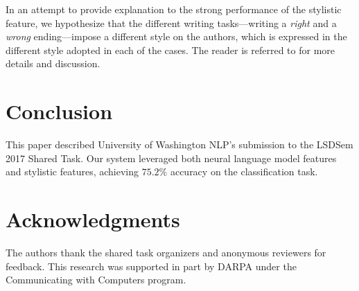 \documentclass[a4paper,11pt]{article}
\begin{document}
In an attempt to provide explanation to the strong performance of the stylistic feature, 
we hypothesize that the different writing tasks---writing a {\it right} and a {\it wrong} ending---impose a different style on the authors, which is expressed in the different style adopted in each of the cases. 
The reader is referred to  for more details and discussion.


\section{Conclusion}
This paper described University of Washington NLP's submission to the LSDSem 2017 Shared Task. 
Our system leveraged both neural language model features and  stylistic features, achieving $75.2\%$ accuracy on the classification task. 

\section*{Acknowledgments}
The authors thank the shared task organizers and anonymous reviewers
for feedback. This research was supported in
part by DARPA under the Communicating with Computers program.



\end{document}
